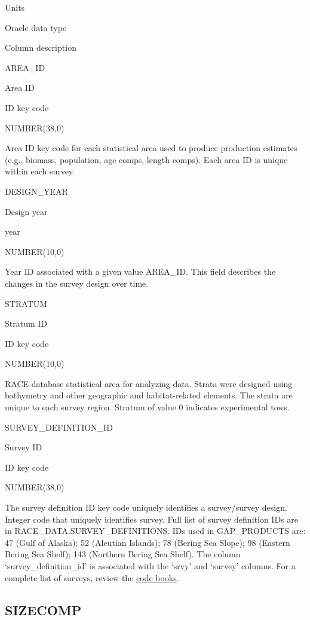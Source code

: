 \documentclass[
  letterpaper,
  oneside,
  open=any]{scrbook}
\begin{document}
Units

Oracle data type

Column description

AREA\_ID

Area ID

ID key code

NUMBER(38,0)

Area ID key code for each statistical area used to produce production
estimates (e.g., biomass, population, age comps, length comps). Each
area ID is unique within each survey.

DESIGN\_YEAR

Design year

year

NUMBER(10,0)

Year ID associated with a given value AREA\_ID. This field describes the
changes in the survey design over time.

STRATUM

Stratum ID

ID key code

NUMBER(10,0)

RACE database statistical area for analyzing data. Strata were designed
using bathymetry and other geographic and habitat-related elements. The
strata are unique to each survey region. Stratum of value 0 indicates
experimental tows.

SURVEY\_DEFINITION\_ID

Survey ID

ID key code

NUMBER(38,0)

The survey definition ID key code uniquely identifies a survey/survey
design. Integer code that uniquely identifies survey. Full list of
survey definition IDs are in RACE\_DATA.SURVEY\_DEFINITIONS. IDs used in
GAP\_PRODUCTS are: 47 (Gulf of Alaska); 52 (Aleutian Islands); 78
(Bering Sea Slope); 98 (Eastern Bering Sea Shelf); 143 (Northern Bering
Sea Shelf). The column `survey\_definition\_id' is associated with the
`srvy' and `survey' columns. For a complete list of surveys, review the
\href{https://www.fisheries.noaa.gov/resource/document/groundfish-survey-species-code-manual-and-data-codes-manual}{code
books}.

\hypertarget{sizecomp}{%
\subsection{SIZECOMP}\label{sizecomp}}
\end{document}
